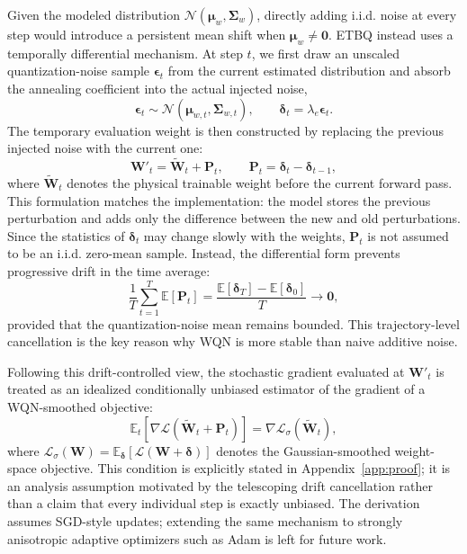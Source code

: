 \documentclass{article}
\begin{document}
Given the modeled distribution $\mathcal{N}(\boldsymbol{\mu}_w, \boldsymbol{\Sigma}_w)$, directly adding i.i.d. noise at every step would introduce a persistent mean shift when $\boldsymbol{\mu}_w \neq \mathbf{0}$. ETBQ instead uses a temporally differential mechanism. At step $t$, we first draw an unscaled quantization-noise sample $\boldsymbol{\epsilon}_{t}$ from the current estimated distribution and absorb the annealing coefficient into the actual injected noise,
\[
\boldsymbol{\epsilon}_{t}\sim \mathcal{N}(\boldsymbol{\mu}_{w,t},\boldsymbol{\Sigma}_{w,t}),
\qquad
\boldsymbol{\delta}_{t}=\lambda_e\boldsymbol{\epsilon}_{t}.
\]
The temporary evaluation weight is then constructed by replacing the previous injected noise with the current one:
\begin{equation} \label{eqt:diff_noise_def}
   \boldsymbol{W}'_t = \widetilde{\boldsymbol{W}}_t + \boldsymbol{P}_t,
   \qquad
   \boldsymbol{P}_t = \boldsymbol{\delta}_{t}-\boldsymbol{\delta}_{t-1},
\end{equation}
where $\widetilde{\boldsymbol{W}}_t$ denotes the physical trainable weight before the current forward pass. This formulation matches the implementation: the model stores the previous perturbation and adds only the difference between the new and old perturbations. Since the statistics of $\boldsymbol{\delta}_{t}$ may change slowly with the weights, $\boldsymbol{P}_t$ is not assumed to be an i.i.d. zero-mean sample. Instead, the differential form prevents progressive drift in the time average:
\[
\frac{1}{T}\sum_{t=1}^{T}\mathbb{E}[\boldsymbol{P}_t]
=
\frac{\mathbb{E}[\boldsymbol{\delta}_{T}]-\mathbb{E}[\boldsymbol{\delta}_{0}]}{T}
\rightarrow \mathbf{0},
\]
provided that the quantization-noise mean remains bounded. This trajectory-level cancellation is the key reason why WQN is more stable than naive additive noise.

Following this drift-controlled view, the stochastic gradient evaluated at $\boldsymbol{W}'_t$ is treated as an idealized conditionally unbiased estimator of the gradient of a WQN-smoothed objective:
\begin{equation}
\label{eqt:latent_trajectory}
\mathbb{E}_{t}\left[\nabla \mathcal{L}(\widetilde{\boldsymbol{W}}_t+\boldsymbol{P}_t)\right]
=
\nabla \mathcal{L}_{\sigma}(\widetilde{\boldsymbol{W}}_t),
\end{equation}
where $\mathcal{L}_{\sigma}(\boldsymbol{W})=\mathbb{E}_{\boldsymbol{\delta}}[\mathcal{L}(\boldsymbol{W}+\boldsymbol{\delta})]$ denotes the Gaussian-smoothed weight-space objective. This condition is explicitly stated in Appendix~\ref{app:proof}; it is an analysis assumption motivated by the telescoping drift cancellation rather than a claim that every individual step is exactly unbiased. The derivation assumes SGD-style updates; extending the same mechanism to strongly anisotropic adaptive optimizers such as Adam is left for future work.
\end{document}
